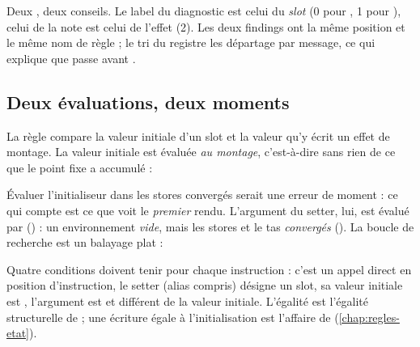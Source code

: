 Deux \Warning{}, deux conseils. Le label du diagnostic est celui du \emph{slot} (0 pour , 1 pour ), celui de la note est celui de l'effet (2). Les deux findings ont la même position et le même nom de règle ; le tri du registre les départage par message, ce qui explique que  passe avant .

\subsection{Deux évaluations, deux moments}

La règle compare la valeur initiale d'un slot et la valeur qu'y écrit un effet de montage. La valeur initiale est évaluée \emph{au montage}, c'est-à-dire sans rien de ce que le point fixe a accumulé :


Évaluer l'initialiseur dans les stores convergés serait une erreur de moment : ce qui compte est ce que voit le \emph{premier} rendu. L'argument du setter, lui, est évalué par  () : un environnement \emph{vide}, mais les stores et le tas \emph{convergés} (). La boucle de recherche est un balayage plat :


Quatre conditions doivent tenir pour chaque instruction : c'est un appel direct  en position d'instruction, le setter (alias compris) désigne un slot, sa valeur initiale est , l'argument est  et différent de la valeur initiale. L'égalité est l'égalité structurelle de  ; une écriture égale à l'initialisation est l'affaire de  (\cref{chap:regles-etat}).

